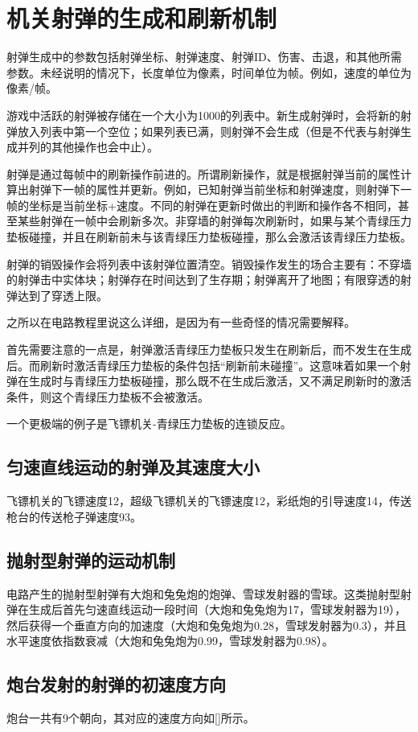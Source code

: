 \chapter{机关射弹的生成和刷新机制}
射弹生成中的参数包括射弹坐标、射弹速度、射弹ID、伤害、击退，和其他所需参数。未经说明的情况下，长度单位为像素，时间单位为帧。例如，速度的单位为像素/帧。

游戏中活跃的射弹被存储在一个大小为1000的列表中。新生成射弹时，会将新的射弹放入列表中第一个空位；如果列表已满，则射弹不会生成（但是不代表与射弹生成并列的其他操作也会中止）。

射弹是通过每帧中的刷新操作前进的。所谓刷新操作，就是根据射弹当前的属性计算出射弹下一帧的属性并更新。例如，已知射弹当前坐标和射弹速度，则射弹下一帧的坐标是当前坐标+速度。不同的射弹在更新时做出的判断和操作各不相同，甚至某些射弹在一帧中会刷新多次。非穿墙的射弹每次刷新时，如果与某个青绿压力垫板碰撞，并且在刷新前未与该青绿压力垫板碰撞，那么会激活该青绿压力垫板。

射弹的销毁操作会将列表中该射弹位置清空。销毁操作发生的场合主要有：不穿墙的射弹击中实体块；射弹存在时间达到了生存期；射弹离开了地图；有限穿透的射弹达到了穿透上限。

之所以在电路教程里说这么详细，是因为有一些奇怪的情况需要解释。

首先需要注意的一点是，射弹激活青绿压力垫板只发生在刷新后，而不发生在生成后。而刷新时激活青绿压力垫板的条件包括“刷新前未碰撞”。这意味着如果一个射弹在生成时与青绿压力垫板碰撞，那么既不在生成后激活，又不满足刷新时的激活条件，则这个青绿压力垫板不会被激活。

一个更极端的例子是飞镖机关-青绿压力垫板的连锁反应。

\section{匀速直线运动的射弹及其速度大小}
飞镖机关的飞镖速度12，超级飞镖机关的飞镖速度12，彩纸炮的引导速度14，传送枪台的传送枪子弹速度93。

\section{抛射型射弹的运动机制}
电路产生的抛射型射弹有大炮和兔兔炮的炮弹、雪球发射器的雪球。这类抛射型射弹在生成后首先匀速直线运动一段时间（大炮和兔兔炮为17，雪球发射器为19），然后获得一个垂直方向的加速度（大炮和兔兔炮为0.28，雪球发射器为0.3），并且水平速度依指数衰减（大炮和兔兔炮为0.99，雪球发射器为0.98）。

\section{炮台发射的射弹的初速度方向}
炮台一共有9个朝向，其对应的速度方向如\autoref{}所示。

